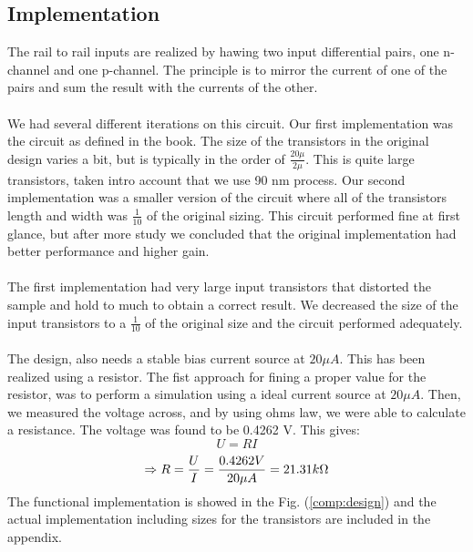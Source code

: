 \documentclass[english, 12pt, a4paper]{ifimaster}
\begin{document}
\subsection{Implementation}
The rail to rail inputs are realized by hawing two input differential pairs, one n-channel and one p-channel.
The principle is to mirror the current of one of the pairs and sum the result with the currents of the other.\\
\\
We had several different iterations on this circuit.
Our first implementation was the circuit as defined in the book. The size of the transistors in the original design varies a bit, but is typically in the order of 
\( \frac{20\mu}{2\mu} \). This is quite large transistors, taken intro account that we use 90 nm process. 
Our second implementation was a smaller version of the circuit where all of the transistors length and width was \( \frac{1}{10} \) of the original sizing. 
This circuit performed fine at first glance, but after more study we concluded that the original implementation had better performance and higher gain.\\ 
\\
The first implementation had very large input transistors that distorted the sample and hold to much to obtain a correct result.
We decreased the size of the input transistors to a \( \frac{1}{10} \) of the original size and the circuit performed adequately.\\
\\
The design, also needs a stable bias current source at \(20 \mu A\). This has been realized using a resistor. The fist approach for fining a proper value for the resistor,
was to perform a simulation using a ideal current source at \(20 \mu A\). Then, we measured the voltage across, and by using ohms law, we were able to calculate a resistance.
The voltage was found to be 0.4262 V. This gives:
\begin{equation}
 U = RI
\end{equation}
\begin{equation}
 \Rightarrow R = \frac{U}{I} = \frac{0.4262 V}{20 \mu A} = 21.31 k\ohm	
\end{equation}
\newline
The functional implementation is showed in the Fig. (\ref{comp:design}) and the actual implementation including sizes for the transistors are included in the appendix.
\end{document}
